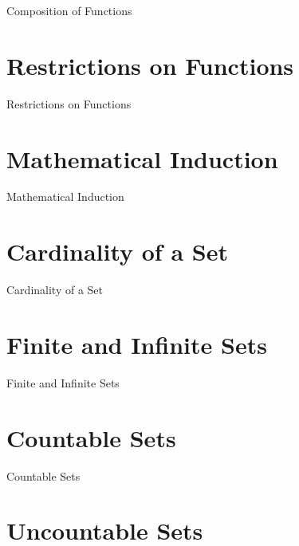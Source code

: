 Composition of Functions

\section{Restrictions on Functions}
\label{sec:restrictions-on-functions}

Restrictions on Functions

\section{Mathematical Induction}
\label{sec:mathematical-induction}

Mathematical Induction

\section{Cardinality of a Set}
\label{sec:cardinality-of-a-set}

Cardinality of a Set

\section{Finite and Infinite Sets}
\label{sec:finite-and-infinite-sets}

Finite and Infinite Sets

\section{Countable Sets}
\label{sec:countable-sets}

Countable Sets

\section{Uncountable Sets}
\label{sec:uncountable-sets}

